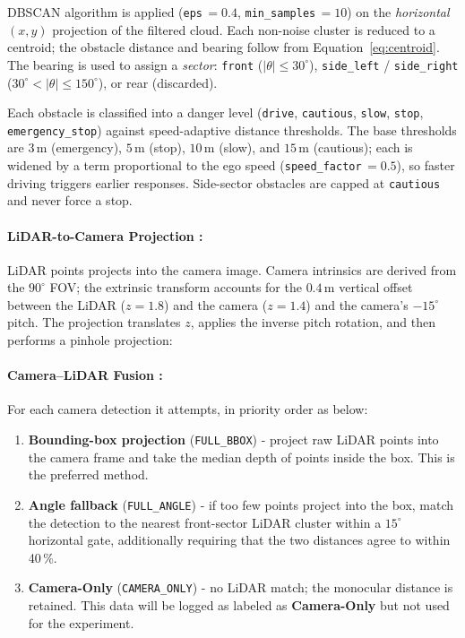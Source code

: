 \documentclass[12pt, a4paper]{report}
\begin{document}
DBSCAN algorithm is applied
(\texttt{eps}\,$=0.4$, \texttt{min\_samples}\,$=10$) on the \emph{horizontal}
$(x,y)$ projection of the filtered cloud. Each non-noise cluster is reduced to a
centroid; the obstacle distance and bearing follow from
Equation~\ref{eq:centroid}. The bearing is used to assign a \emph{sector}:
\texttt{front} ($|\theta| \le 30^\circ$), \texttt{side\_left} /
\texttt{side\_right} ($30^\circ < |\theta| \le 150^\circ$), or rear (discarded).

Each obstacle is classified into a danger level
(\texttt{drive}, \texttt{cautious}, \texttt{slow}, \texttt{stop},
\texttt{emergency\_stop}) against
speed-adaptive distance thresholds. The base thresholds are
$3$\,m (emergency), $5$\,m (stop), $10$\,m (slow), and $15$\,m (cautious); each
is widened by a term proportional to the ego speed
(\texttt{speed\_factor}\,$=0.5$), so faster driving triggers earlier responses.
Side-sector obstacles are capped at \texttt{cautious} and never force a stop.

\paragraph{LiDAR-to-Camera Projection :}

LiDAR points projects into the camera image. Camera intrinsics are derived from the
$90^\circ$ FOV; the extrinsic transform accounts for the $0.4$\,m vertical
offset between the LiDAR ($z=1.8$) and the camera ($z=1.4$) and the camera's
$-15^\circ$ pitch. The projection translates $z$, applies the inverse pitch
rotation, and then performs a pinhole projection:

\paragraph{Camera--LiDAR Fusion :}
For each camera detection it attempts, in priority order as below:

\begin{enumerate}
    \item \textbf{Bounding-box projection} (\texttt{FULL\_BBOX}) - project raw
    LiDAR points into the camera frame and take the median depth of points
    inside the box. This is the preferred method.
    \item \textbf{Angle fallback} (\texttt{FULL\_ANGLE}) - if too few points
    project into the box, match the detection to the nearest front-sector LiDAR
    cluster within a $15^\circ$ horizontal gate, additionally requiring that the
    two distances agree to within 40\,\%.
    \item \textbf{Camera-Only} (\texttt{CAMERA\_ONLY}) - no LiDAR match; the
    monocular distance is retained. This data will be logged as labeled as \textbf{Camera-Only} but not used for the experiment.
\end{enumerate}
\end{document}
